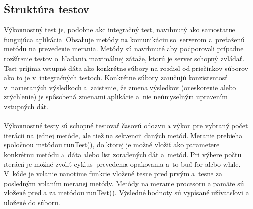 \documentclass[
  printed, %
  table,   %
oneside,
  nolof,     %
  nolot,     %
]{fithesis3}
\begin{document}
\subsection{Štruktúra testov}
Výkonnostný test je, podobne ako integračný test, navrhnutý ako samostatne fungujúca aplikácia. Obsahuje metódy na komunikáciu so~serverom a~preťaženú metódu na prevedenie merania. Metódy sú navrhnuté aby podporovali prípadne rozšírenie testov o~hľadania maximálnej zátaže, ktorú je server schopný zvládať. Test príjíma vstupné dáta ako konkrétne súbory na rozdiel od priečinkov súborov ako to je v~integračných testoch. Konkrétne súbory zaručujú konzistentosť v~nameraných výsledkoch a~zaistenie, že zmena výsledkov (oneskorenie alebo zrýchlenie) je spôsobená zmenami aplikácie a~nie neúmyselným upravením vstupných dát. \paragraph{}

Výkonnostné testy sú schopné testovať časovú odozvu a výkon pre vybraný počet iterácii na jednej metóde, ale tiež na sekvencii daných metód. Meranie prebieha spoločnou metódou runTest(), do ktorej je možné vložiť ako parametere konkrétnu metódu a~dáta alebo list zoradených dát a~metód. Pri výbere počtu iterácií je možné zvoliť cyklus~prevedenia opakovania a~to buď for alebo while.
V~kóde je  volanie nanotime funkcie vložené tesne pred prvým a~tesne za posledným volaním meranej metódy. Metódy na meranie procesoru a pamäte sú vložené pred a za metódou runTest(). Výsledné hodnoty sú vypísané užívateľovi a uložené do súboru. 
\end{document}
